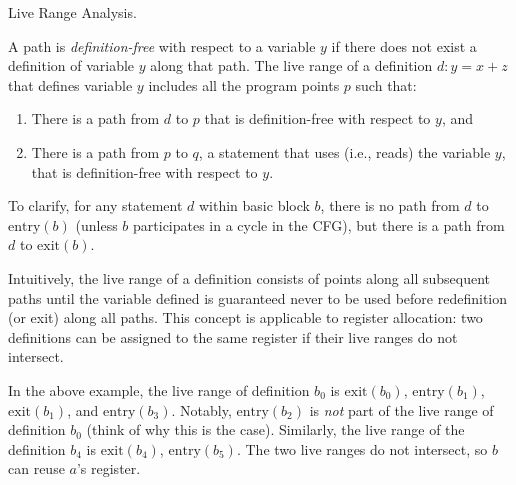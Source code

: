 \begin{problem}
Live Range Analysis.

\item A path is \emph{definition-free} with respect to a variable $y$ if
there does not exist a definition of variable $y$ along that path.
The live range of a definition $d\colon y = x + z$ that defines variable $y$ includes all the program points $p$ such that:
\begin{enumerate}
	\item There is a path from $d$ to $p$ that is definition-free with respect to $y$, and
	\item There is a path from $p$ to $q$, a statement that uses (i.e., reads) the variable $y$, that is definition-free with respect to $y$.
\end{enumerate}
To clarify, for any statement $d$ within basic block $b$, there is no path from $d$ to $\mathrm{entry}(b)$ (unless $b$ participates in a cycle in the CFG), but there is a path from $d$ to $\mathrm{exit}(b)$.

Intuitively, the live range of a definition consists of points along all subsequent paths until the variable defined is guaranteed never to be used before redefinition (or exit) along all paths. This concept is applicable to register allocation: two definitions can be assigned to the same register if their live ranges do not intersect.

\begin{center}
\end{center}
In the above example, the live range of definition $b_0$ is $\mathrm{exit}(b_0)$,
$\mathrm{entry}(b_1)$, $\mathrm{exit}(b_1)$, and $\mathrm{entry}(b_3)$. Notably, $\mathrm{entry}(b_2)$ is \emph{not} part of the live range of definition $b_0$ (think of why this is the case). Similarly, the live range
of the definition $b_4$ is $\mathrm{exit}(b_4)$, $\mathrm{entry}(b_5)$. The two
live ranges do not intersect, so $b$ can reuse $a$'s register.


\end{problem}
